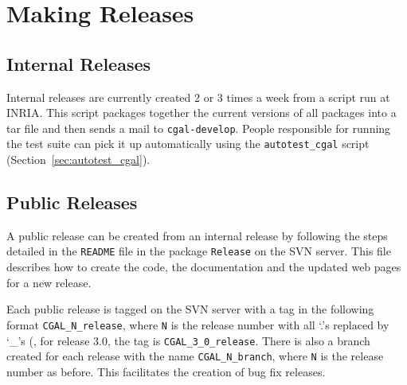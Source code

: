 \chapter{Making Releases}
\label{chap:releases}

\section{Internal Releases}
\label{sec:internal_releases}

Internal releases are currently created 2 or 3 times a week from a script run
at INRIA.  This script packages together the current versions of all
packages into a tar file and then sends a mail to {\tt cgal-develop}.
People responsible for running the test suite can pick it up automatically
using the {\tt autotest\_cgal} script (Section~\ref{sec:autotest_cgal}).

\section{Public Releases}
\label{sec:public_releases}

A public release can be created from an internal release by following the
steps detailed in the
\texttt{README} file in the package \texttt{Release} on the SVN server.
This file describes how to create the code, the documentation and the
updated web pages for a new release.

Each public release is tagged on the SVN server with a tag in the following
format \texttt{CGAL\_N\_release}, where \texttt{N} is the release number
with all `.'s replaced by `\_'s (\eg, for release 3.0, the tag is
\texttt{CGAL\_3\_0\_release}.  There is also a branch created for
each release with the name \texttt{CGAL\_N\_branch}, where \texttt{N} is
the release number as before.  This facilitates the creation of bug fix
releases.

